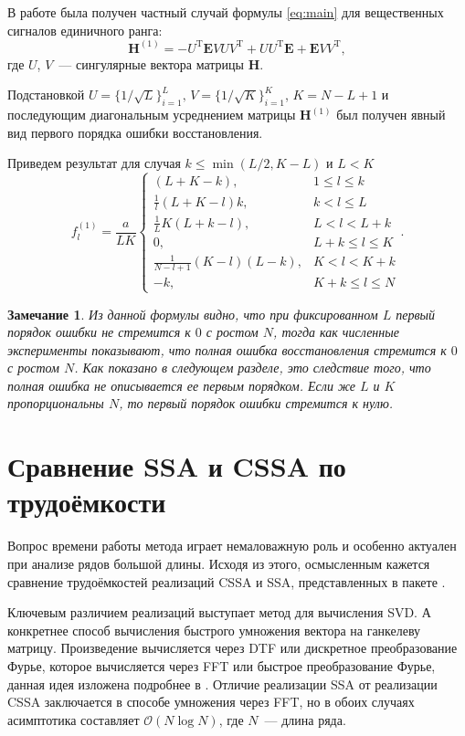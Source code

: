 \documentclass[12pt,a4paper]{article}
\newtheorem{remark}{Замечание}%
\begin{document}
В работе \cite{NekrutkinPerp} была получен частный случай формулы \eqref{eq:main} для вещественных сигналов единичного ранга:
$$\mathbf{H}^{(1)} = -U^{\mathrm{T}} \mathbf{E} V U V^{\mathrm{T}} + U U^{\mathrm{T}} \mathbf{E} + \mathbf{E} V V^{\mathrm{T}},$$
где $U$, $V$~--- сингулярные вектора матрицы $\mathbf{H}$.

Подстановкой $U = \{1/\sqrt{L}\}^{L}_{i = 1},\, V = \{1/\sqrt{K}\}^{K}_{i = 1}$, $K = N - L + 1$ и последующим диагональным усреднением матрицы $\mathbf{H}^{(1)}$ был получен явный вид первого порядка ошибки восстановления.

Приведем результат для случая $k \leq \min(L/2, K - L)$ и $L < K$
$$f^{(1)}_l = \frac{a}{{LK}}
\begin{cases}
	(L + K - k), & \text{$1 \leq l \leq k$}\\
	\frac{1}{l}(L + K - l)k, & \text{$k < l \leq L$}\\
	\frac{1}{L}K(L + k - l), &\text{$L < l < L + k$}\\
	0, &\text{$L + k \leq l \leq K$}\\
	\frac{1}{N - l + 1}(K - l)(L - k), &\text{$K < l < K + k$}\\
	-k, &\text{$K + k \leq l \leq N $}
\end{cases}.$$

\begin{remark}
Из данной формулы видно, что при фиксированном $L$ первый порядок ошибки не стремится к $0$ с ростом $N$, тогда как численные эксперименты показывают, что полная ошибка восстановления стремится к $0$ с ростом $N$. Как показано в следующем разделе, это следствие того, что полная ошибка не описывается ее первым порядком. Если же $L$ и $K$ пропорциональны $N$, то первый порядок ошибки стремится к нулю.
\end{remark}

\section{Сравнение SSA и CSSA по трудоёмкости}

Вопрос времени работы метода играет немаловажную роль и особенно актуален при анализе рядов большой длины. Исходя из этого, осмысленным кажется сравнение трудоёмкостей реализаций CSSA и SSA, представленных в пакете \cite{Korobeynikov.etal2014}.

Ключевым различием реализаций выступает метод для вычисления SVD. А конкретнее способ вычисления быстрого умножения вектора на ганкелеву матрицу. Произведение вычисляется через DTF или дискретное преобразование Фурье, которое вычисляется через FFT или быстрое преобразование Фурье, данная идея изложена подробнее в \cite{}. Отличие реализации SSA от реализации CSSA заключается в способе умножения через FFT, но в обоих случаях асимптотика составляет $\mathcal{O}(N \log N)$, где $N$~--- длина ряда.
\end{document}

